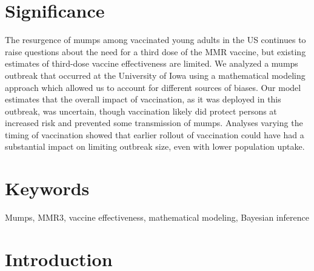 \documentclass[12pt]{article}
\begin{document}
\section*{Significance}
The resurgence of mumps among vaccinated young adults in the US continues to raise questions about the need for a third dose of the MMR vaccine, but existing estimates of third-dose vaccine effectiveness are limited.
We analyzed a mumps outbreak that occurred at the University of Iowa using a mathematical modeling approach which allowed us to account for different sources of biases. 
Our model estimates that the overall impact of vaccination, as it was deployed in this outbreak, was uncertain, though vaccination likely did protect persons at increased risk and prevented some transmission of mumps. 
Analyses varying the timing of vaccination showed that earlier rollout of vaccination could have had a substantial impact on limiting outbreak size, even with lower population uptake.

\section*{Keywords}
Mumps, MMR3, vaccine effectiveness, mathematical modeling, Bayesian inference

\pagebreak

\section{Introduction}
\end{document}
